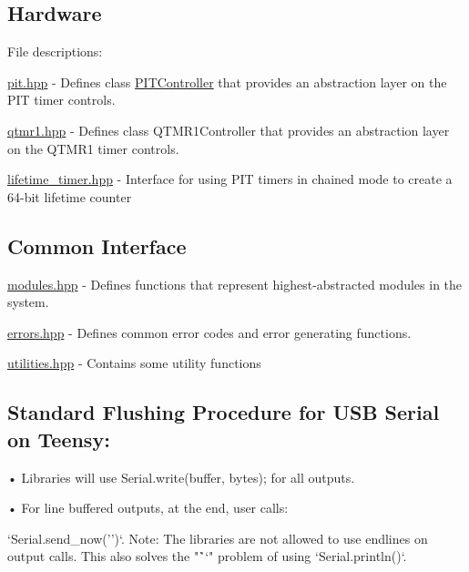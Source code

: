 \subsection*{Hardware}

File descriptions\+:


\begin{DoxyItemize}
\item {\ttfamily \hyperlink{pit_8hpp}{pit.\+hpp}} -\/ Defines {\ttfamily class \hyperlink{classPITController}{P\+I\+T\+Controller}} that provides an abstraction layer on the P\+IT timer controls.
\end{DoxyItemize}

{\ttfamily \hyperlink{qtmr1_8hpp}{qtmr1.\+hpp}} -\/ Defines \textquotesingle{}class Q\+T\+M\+R1\+Controller\textquotesingle{} that provides an abstraction layer on the Q\+T\+M\+R1 timer controls.
\begin{DoxyItemize}
\item {\ttfamily \hyperlink{lifetime__timer_8hpp}{lifetime\+\_\+timer.\+hpp}} -\/ Interface for using P\+IT timers in chained mode to create a 64-\/bit lifetime counter
\end{DoxyItemize}

\subsection*{Common Interface}


\begin{DoxyItemize}
\item {\ttfamily \hyperlink{modules_8hpp}{modules.\+hpp}} -\/ Defines functions that represent highest-\/abstracted modules in the system.
\item {\ttfamily \hyperlink{errors_8hpp}{errors.\+hpp}} -\/ Defines common error codes and error generating functions.
\item {\ttfamily \hyperlink{utilities_8hpp}{utilities.\+hpp}} -\/ Contains some utility functions
\end{DoxyItemize}

\subsection*{Standard Flushing Procedure for U\+SB Serial on Teensy\+:}

• Libraries will use {\ttfamily Serial.\+write(buffer, bytes);} for all outputs.

• For line buffered outputs, at the end, user calls\+: \begin{DoxyVerb}`Serial.send_now('\n')`. Note: The libraries are not allowed to use endlines on output calls. This also solves the "`\r\n`" problem of using `Serial.println()`.
\end{DoxyVerb}


